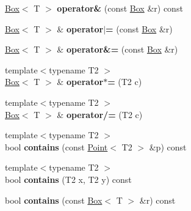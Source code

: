 \begin{DoxyCompactItemize}
\item 
\hypertarget{class_box_a4e303bf9c573dba8cfe7b6f699741040}{
\hyperlink{class_box}{Box}$<$ T $>$ {\bfseries operator\&} (const \hyperlink{class_box}{Box} \&r) const }
\label{class_box_a4e303bf9c573dba8cfe7b6f699741040}

\item 
\hypertarget{class_box_a39321d3603921427af4abc73cf6409df}{
\hyperlink{class_box}{Box}$<$ T $>$ \& {\bfseries operator$|$=} (const \hyperlink{class_box}{Box} \&r)}
\label{class_box_a39321d3603921427af4abc73cf6409df}

\item 
\hypertarget{class_box_acbbf74126e4790b025fdfb4942d5b7e7}{
\hyperlink{class_box}{Box}$<$ T $>$ \& {\bfseries operator\&=} (const \hyperlink{class_box}{Box} \&r)}
\label{class_box_acbbf74126e4790b025fdfb4942d5b7e7}

\item 
\hypertarget{class_box_aa18658b5477c00c191f9b3c855924b2f}{
{\footnotesize template$<$typename T2 $>$ }\\\hyperlink{class_box}{Box}$<$ T $>$ \& {\bfseries operator$\ast$=} (T2 c)}
\label{class_box_aa18658b5477c00c191f9b3c855924b2f}

\item 
\hypertarget{class_box_a51aa00812060d1e4665b4a0be9935cb8}{
{\footnotesize template$<$typename T2 $>$ }\\\hyperlink{class_box}{Box}$<$ T $>$ \& {\bfseries operator/=} (T2 c)}
\label{class_box_a51aa00812060d1e4665b4a0be9935cb8}

\item 
\hypertarget{class_box_a349c282feb79bd25acd2e019e324cb29}{
{\footnotesize template$<$typename T2 $>$ }\\bool {\bfseries contains} (const \hyperlink{class_point}{Point}$<$ T2 $>$ \&p) const }
\label{class_box_a349c282feb79bd25acd2e019e324cb29}

\item 
\hypertarget{class_box_ac9591ddb1c83a71913baaa7339b6b320}{
{\footnotesize template$<$typename T2 $>$ }\\bool {\bfseries contains} (T2 x, T2 y) const }
\label{class_box_ac9591ddb1c83a71913baaa7339b6b320}

\item 
\hypertarget{class_box_add30ee8481bd46e34b4f3a63a126712a}{
bool {\bfseries contains} (const \hyperlink{class_box}{Box}$<$ T $>$ \&r) const }
\label{class_box_add30ee8481bd46e34b4f3a63a126712a}


\end{DoxyCompactItemize}
